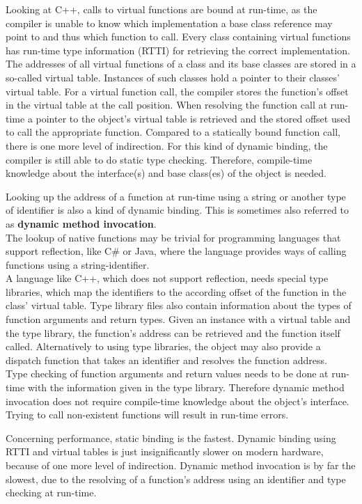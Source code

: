 Looking at C++, calls to virtual functions are bound at run-time, as the compiler is unable to know which implementation a base class reference may point to and thus which function to call. Every class containing virtual functions has run-time type information (RTTI) for retrieving the correct implementation. The addresses of all virtual functions of a class and its base classes are stored in a so-called virtual table. Instances of such classes hold a pointer to their classes' virtual table. For a virtual function call, the compiler stores the function's offset in the virtual table at the call position. When resolving the function call at run-time a pointer to the object's virtual table is retrieved and the stored offset used to call the appropriate function. Compared to a statically bound function call, there is one more level of indirection. For this kind of dynamic binding, the compiler is still able to do static type checking. Therefore, compile-time knowledge about the interface(s) and base class(es) of the object is needed. 

Looking up the address of a function at run-time using a string or another type of identifier is also a kind of dynamic binding. This is sometimes also referred to as \textbf{dynamic method invocation}.\\
The lookup of native functions may be trivial for programming languages that support reflection, like C\# or Java, where the language provides ways of calling functions using a string-identifier.\\
A language like C++, which does not support reflection, needs special type libraries, which map the identifiers to the according offset of the function in the class' virtual table. Type library files also contain information about the types of function arguments and return types. Given an instance with a virtual table and the type library, the function's address can be retrieved and the function itself called. Alternatively to using type libraries, the object may also provide a dispatch function that takes an identifier and resolves the function address.
\\Type checking of function arguments and return values needs to be done at run-time with the information given in the type library. Therefore dynamic method invocation does not require compile-time knowledge about the object's interface. Trying to call non-existent functions will result in run-time errors.

Concerning performance, static binding is the fastest. Dynamic binding using RTTI and virtual tables is just insignificantly slower on modern hardware, because of one more level of indirection. Dynamic method invocation is by far the slowest, due to the resolving of a function's address using an identifier and type checking at run-time. 

